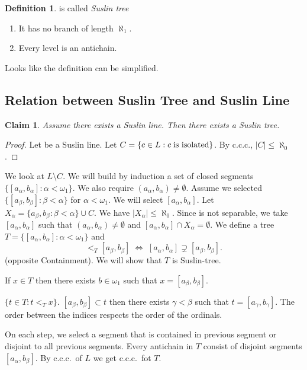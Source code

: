 \documentclass[11pt,pdftex,twoside,a4paper]{article}
\newcommand{\ccc}{c.c.c.}
\newtheorem{claim}[thm]{Claim}
\theoremstyle{definition}
\newtheorem{ldef}[thm]{Definition}
\begin{document}
{\begin{ldef}
  is called \emph{Suslin tree} 
\begin{enumerate}
\item It has no branch of length \(\aleph_1\).
\item Every level is an antichain.
\end{enumerate}
\end{ldef}
Looks like the definition can be simplified.

\subsection{Relation between Suslin Tree and Suslin Line}

\begin{claim}
Assume there exists a Suslin line. Then there exists a Suslin tree. 
\end{claim}
\begin{proof}
Let  be a Suslin line. Let
\(C=\{c\in L: c\;\textnormal{is isolated}\}\).
By \ccc, \(|C|\leq\aleph_0\).
\end{proof}
We look at \(L\setminus C\). We will build by induction
a set of closed segments \(\{[a_\alpha,b_\alpha]: \alpha<\omega_1\}\).
We also require \((a_\alpha,b_\alpha)\neq\emptyset\).
Assume we selected  \(\{[a_\beta,b_\beta]: \beta<\alpha\}\)
for \(\alpha<\omega_1\). We will select \([a_\alpha,b_\alpha]\).
Let \(X_\alpha = \{a_\beta,b_\beta: \beta<\alpha\} \cup C\).
We have \(|X_\alpha|\leq \aleph_0\).
Since  is not separable,
we take \([a_\alpha,b_\alpha]\) such that 
\((a_\alpha,b_\alpha)\neq \emptyset\) 
and \([a_\alpha,b_\alpha]\cap X_\alpha = \emptyset\).
We define a tree \(T=\{[a_\alpha,b_\alpha]: \alpha<\omega_1\}\) and
\begin{equation*}
[a_\alpha,b_\alpha] <_T [a_\beta,b_\beta]
\;\iff\; 
[a_\alpha,b_\alpha] \supsetneq [a_\beta,b_\beta].
\end{equation*}
(opposite Containment). We will show that $T$ is Suslin-tree.

If \(x\in T\) then there exists \(b\in\omega_1\)
such that \(x=[a_\beta,b_\beta]\).

\(\{t\in T: t <_T x\}\).
\([a_\beta,b_\beta]\subset t\) then there exists \(\gamma < \beta\)
such that \(t = [a_\gamma,b_\gamma]\).
The order between the indices respects the order of the ordinals.

On each step, we select a segment that is contained in
previous segment or disjoint to all previous segments.
Every antichain in $T$ consist of disjoint segments \([a_\alpha, b_\beta]\).
By \ccc\ of $L$ we get \ccc\ fot $T$.

}
\end{document}
